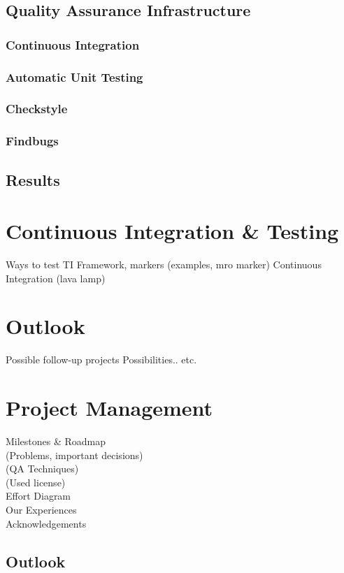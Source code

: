 \documentclass[12pt,halfparskip]{scrreprt}
\begin{document}
\section{Quality Assurance Infrastructure}
\subsection{Continuous Integration}
\subsection{Automatic Unit Testing}
\subsection{Checkstyle}
\subsection{Findbugs}
\section{Results}

\chapter{Continuous Integration \& Testing}
 Ways to test TI
 Framework, markers
  (examples, mro marker)
 Continuous Integration
  (lava lamp)

\chapter{Outlook}
 Possible follow-up projects
 Possibilities.. etc.

\chapter{Project Management}
 Milestones \& Roadmap \\
 (Problems, important decisions) \\
 (QA Techniques) \\
 (Used license) \\
 Effort Diagram \\
 Our Experiences \\
 Acknowledgements 

\section{Outlook}
\end{document}
